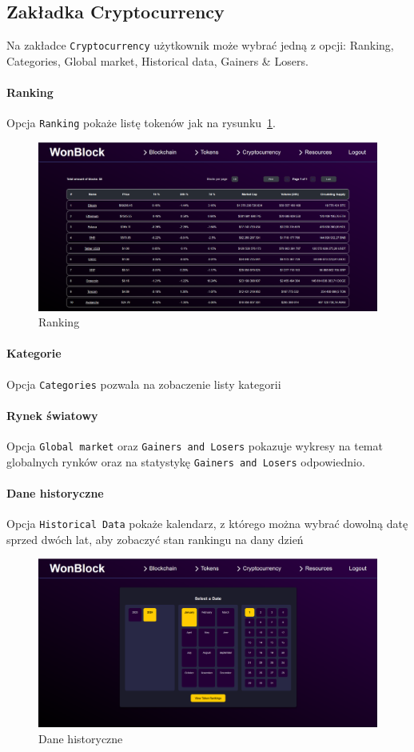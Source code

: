 \subsection{Zakładka Cryptocurrency}
Na zakładce \texttt{Cryptocurrency} użytkownik może wybrać jedną z opcji: Ranking, Categories, Global market, Historical data, Gainers \& Losers.

\paragraph{Ranking}
Opcja \texttt{Ranking} pokaże listę tokenów jak na rysunku~\ref{fig:Ranking}.
\begin{figure}[htb]
    \centering
    \includegraphics[width=0.8\linewidth]{./instrukcja/Ranking.png}
    \caption{Ranking}
    \label{fig:Ranking}
\end{figure}

\paragraph{Kategorie}
Opcja \texttt{Categories} pozwala na zobaczenie listy kategorii

\paragraph{Rynek światowy}
Opcja \texttt{Global market} oraz \texttt{Gainers and Losers} pokazuje wykresy na temat globalnych rynków oraz na statystykę \texttt{Gainers and Losers} odpowiednio.


\paragraph{Dane historyczne}
Opcja \texttt{Historical Data} pokaże kalendarz, z którego można wybrać dowolną datę sprzed dwóch lat, aby zobaczyć stan rankingu na dany dzień
\begin{figure}[htb]
    \centering
    \includegraphics[width=0.8\linewidth]{./instrukcja/HistoricalData.png}
    \caption{Dane historyczne}
    \label{fig:Dane historyczne}
\end{figure}


